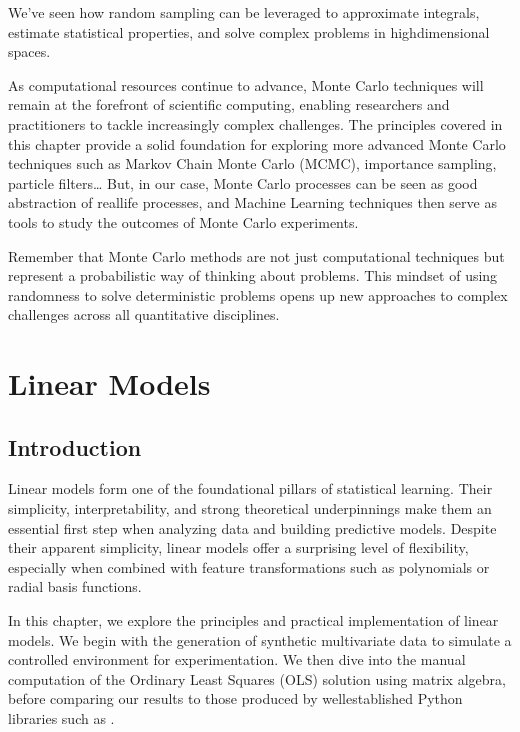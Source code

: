 \documentclass[letterpaper,10pt,english]{jupyterBook}
\begin{document}
\sphinxAtStartPar
We’ve seen how random sampling can be leveraged to approximate integrals, estimate statistical properties, and solve complex problems in high\sphinxhyphen{}dimensional spaces.

\sphinxAtStartPar
As computational resources continue to advance, Monte Carlo techniques will remain at the forefront of scientific computing, enabling researchers and practitioners to tackle increasingly complex challenges. The principles covered in this chapter provide a solid foundation for exploring more advanced Monte Carlo techniques such as Markov Chain Monte Carlo (MCMC), importance sampling, particle filters… But, in our case, Monte Carlo processes can be seen as good abstraction of real\sphinxhyphen{}life processes, and Machine Learning techniques then serve as tools to study the outcomes of Monte Carlo experiments.

\sphinxAtStartPar
Remember that Monte Carlo methods are not just computational techniques but represent a probabilistic way of thinking about problems. This mindset of using randomness to solve deterministic problems opens up new approaches to complex challenges across all quantitative disciplines.

\sphinxstepscope


\chapter{Linear Models}
\label{\detokenize{02:linear-models}}\label{\detokenize{02::doc}}

\section{Introduction}
\label{\detokenize{02:introduction}}
\sphinxAtStartPar
Linear models form one of the foundational pillars of statistical learning. Their simplicity, interpretability, and strong theoretical underpinnings make them an essential first step when analyzing data and building predictive models. Despite their apparent simplicity, linear models offer a surprising level of flexibility, especially when combined with feature transformations such as polynomials or radial basis functions.

\sphinxAtStartPar
In this chapter, we explore the principles and practical implementation of linear models. We begin with the generation of synthetic multivariate data to simulate a controlled environment for experimentation. We then dive into the manual computation of the Ordinary Least Squares (OLS) solution using matrix algebra, before comparing our results to those produced by well\sphinxhyphen{}established Python libraries such as .
\end{document}
